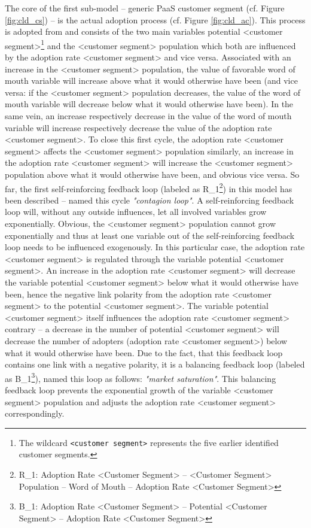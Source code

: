 The core of the first sub-model -- generic \ac{PaaS} customer segment (cf. Figure \ref{fig:cld_cs}) -- is the actual adoption process (cf. Figure \ref{fig:cld_ac}). This process is adopted from \citet[p. 18]{Sterman2001} and consists of the two main variables potential <customer segment>\footnote{The wildcard \texttt{<customer segment>} represents the five earlier identified customer segments.} and the <customer segment> population which both are influenced by the adoption rate <customer segment> and vice versa. Associated with an increase in the <customer segment> population, the value of favorable word of mouth variable will increase above what it would otherwise have been (and vice versa: if the <customer segment> population decreases, the value of the word of mouth variable will decrease below what it would otherwise have been). In the same vein, an increase respectively decrease in the value of the word of mouth variable will increase respectively decrease the value of the adoption rate <customer segment>. To close this first cycle, the adoption rate <customer segment> affects the <customer segment> population similarly, an increase in the adoption rate <customer segment> will increase the <customer segment> population above what it would otherwise have been, and obvious vice versa. So far, the first self-reinforcing feedback loop (labeled as R\_1\footnote{R\_1: Adoption Rate <Customer Segment> -- <Customer Segment> Population -- Word of Mouth -- Adoption Rate <Customer Segment>}) in this model has been described -- \citet[p. 19]{Sterman2001} named this cycle \textit{"contagion loop"}. A self-reinforcing feedback loop will, without any outside influences, let all involved variables grow exponentially. Obvious, the <customer segment> population cannot grow exponentially and thus at least one variable out of the self-reinforcing feedback loop needs to be influenced exogenously. In this particular case, the adoption rate <customer segment> is regulated through the variable potential <customer segment>. An increase in the adoption rate <customer segment> will decrease the variable potential <customer segment> below what it would otherwise have been, hence the negative link polarity from the adoption rate <customer segment> to the potential <customer segment>. The variable potential <customer segment> itself influences the adoption rate <customer segment> contrary -- a decrease in the number of potential <customer segment> will decrease the number of adopters (adoption rate <customer segment>) below what it would otherwise have been. Due to the fact, that this feedback loop contains one link with a negative polarity, it is a balancing feedback loop (labeled as B\_1\footnote{B\_1: Adoption Rate <Customer Segment> -- Potential <Customer Segment> -- Adoption Rate <Customer Segment>}), \citet[p. 18]{Sterman2001} named this loop as follows: \textit{"market saturation"}. This balancing feedback loop prevents the exponential growth of the variable <customer segment> population and adjusts the adoption rate <customer segment> correspondingly.

